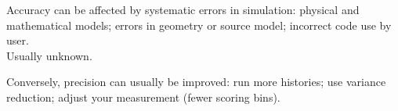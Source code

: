\documentclass[12pt]{article}
\begin{document}
Accuracy can be affected by systematic errors in simulation: physical and mathematical models; errors in geometry or source model; incorrect code use by user.\\
Usually unknown.

Conversely, precision can usually be improved: run more histories; use variance reduction; adjust your measurement (fewer scoring bins).

\vspace*{1 em}
\end{document}
